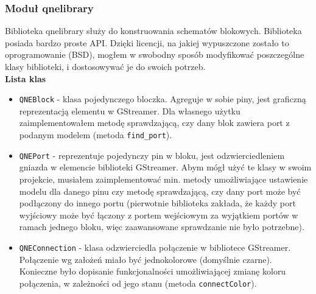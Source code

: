 \documentclass[12pt]{article}
\begin{document}
\subsubsection{Moduł qnelibrary}
Biblioteka qnelibrary\cite{algoholic} służy do konstruowania schematów blokowych. Biblioteka posiada bardzo proste API. Dzięki licencji, na jakiej wypuszczone zostało to oprogramowanie (BSD), mogłem w swobodny sposób modyfikować poszczególne klasy biblioteki, i dostosowywać je do swoich potrzeb.\\
\textbf{Lista klas}
\begin{itemize}
 \setlength{\itemsep}{0em}
\item \texttt{QNEBlock} - klasa pojedynczego bloczka. Agreguje w sobie piny, jest graficzną reprezentacją elementu w GStreamer. Dla własnego użytku zaimplementowałem metodę sprawdzającą, czy dany blok zawiera port z podanym modelem (metoda \texttt{find\_port}).
\item \texttt{QNEPort} - reprezentuje pojedynczy pin w bloku, jest odzwierciedleniem gniazda w elemencie biblioteki GStreamer. Abym mógł użyć te klasy w swoim projekcie, musiałem zaimplementować min. metody umożliwiające ustawienie modelu dla danego pinu czy metodę sprawdzającą, czy dany port może być podłączony do innego portu (pierwotnie biblioteka zakłada, że każdy port wyjściowy może być łączony z portem wejściowym za wyjątkiem portów w ramach jednego bloku, więc zaawansowane sprawdzanie nie było potrzebne).
\item \texttt{QNEConnection} - klasa odzwierciedla połączenie w bibliotece GStreamer. Połączenie wg założeń miało być jednokolorowe (domyślnie czarne). Konieczne było dopisanie funkcjonalności umożliwiającej zmianę koloru połączenia, w zależności od jego stanu (metoda \texttt{connectColor}).
\end{itemize}
\end{document}
